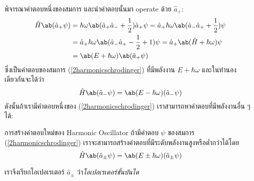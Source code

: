 พิจารณาคำตอบหนึ่งของสมการ และนำคำตอบนั้นมา operate ด้วย $\hat{a}_+$:
\begin{align*}
    \hat{H}\ab(\hat{a}_+\psi) &= \hbar\omega\ab(\hat{a}_+\hat{a}_- + \frac{1}{2})\hat{a}_+\psi = \hat{a}_+\hbar\omega\ab(\hat{a}_-\hat{a}_+ + \frac{1}{2})\psi\\
    &= \hat{a}_+\hbar\omega\ab(\hat{a}_-\hat{a}_+ - \frac{1}{2} + 1)\psi = \hat{a}_+\ab(\hat{H} + \hbar\omega)\psi\\
    &=\ab(E + \hbar\omega)\ab(\hat{a}_+\psi)
\end{align*}
ซึ่งเป็นคำตอบของสมการ (\ref{2harmonicschrodinger}) ที่มีพลังงาน $E + \hbar\omega$ และในทำนองเดียวกันจะได้ว่า
\[
	\hat{H}\ab(\hat{a}_-\psi) = \ab(E - \hbar\omega)(\hat{a}_-\psi)
\]
ดังนั้นถ้าเรามีคำตอบหนึ่งของ (\ref{2harmonicschrodinger}) เราสามารถหาคำตอบที่มีพลังงานอื่น ๆ ได้:
\begin{lawbox}{การสร้างคำตอบใหม่ของ Harmonic Oscillator}
    ถ้ามีคำตอบ $\psi$ ของสมการ (\ref{2harmonicschrodinger}) เราจะสามารถสร้างคำตอบที่มีระดับพลังงานสูงหรือต่ำกว่าได้โดย
    \begin{equation*}
        \hat{H}\ab(\hat{a}_\pm\psi) = \ab(E \pm \hbar\omega)(\hat{a}_\pm\psi)
    \end{equation*}
\end{lawbox}
เราจึงเรียกโอเปอเรเตอร์ $\hat{a}_\pm$ ว่า\emph{โอเปอเรเตอร์ขั้นบันได}

